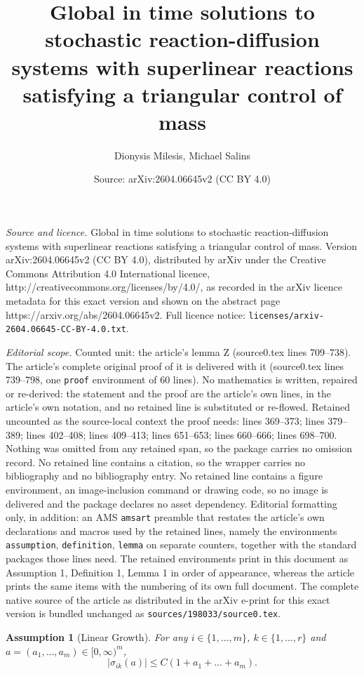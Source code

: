 \documentclass[10pt,a4paper]{amsart}
\title{Global in time solutions to stochastic reaction-diffusion systems with superlinear reactions satisfying a triangular control of mass}
\author{Dionysis Milesis, Michael Salins}
\date{Source: arXiv:2604.06645v2 (CC BY 4.0)}
\newtheorem{assumption}{Assumption}
\begin{document}
\maketitle

\noindent\emph{Source and licence.} Global in time solutions to stochastic reaction-diffusion systems with superlinear reactions satisfying a triangular control of mass. Version arXiv:2604.06645v2 (CC BY 4.0), distributed by arXiv under the Creative Commons Attribution 4.0 International licence, http://creativecommons.org/licenses/by/4.0/, as recorded in the arXiv licence metadata for this exact version and shown on the abstract page https://arxiv.org/abs/2604.06645v2. Full licence notice: \texttt{licenses/arxiv-2604.06645-CC-BY-4.0.txt}.\par\smallskip

\noindent\textit{Editorial scope.} Counted unit: the article's lemma Z (source0.tex lines 709--738). The article's complete original proof of it is delivered with it (source0.tex lines 739--798, one \texttt{proof} environment of 60 lines). No mathematics is written, repaired or re-derived: the statement and the proof are the article's own lines, in the article's own notation, and no retained line is substituted or re-flowed.  Retained uncounted as the source-local context the proof needs: lines 369--373; lines 379--389; lines 402--408; lines 409--413; lines 651--653; lines 660--666; lines 698--700.  Nothing was omitted from any retained span, so the package carries no omission record.  No retained line contains a citation, so the wrapper carries no bibliography and no bibliography entry.  No retained line contains a figure environment, an image-inclusion command or drawing code, so no image is delivered and the package declares no asset dependency.  Editorial formatting only, in addition: an AMS \texttt{amsart} preamble that restates the article's own declarations and macros used by the retained lines, namely the environments \texttt{assumption}, \texttt{definition}, \texttt{lemma} on separate counters, together with the standard packages those lines need.  The retained environments print in this document as Assumption 1, Definition 1, Lemma 1 in order of appearance, whereas the article prints the same items with the numbering of its own full document.  The complete native source of the article as distributed in the arXiv e-print for this exact version is bundled unchanged as \texttt{sources/198033/source0.tex}.
\begin{assumption}[Linear Growth]\label{assump: Linear growth sigma} For any $i\in \{1,...,m\}$,  $k\in \{1,...,r\}$ and $a = (a_1,...,a_m)\in [0,\infty)^m$,
\[
|\sigma_{ik}(a)| \leq C(1+a_1+...+a_m).
\]
\end{assumption}
\end{document}
